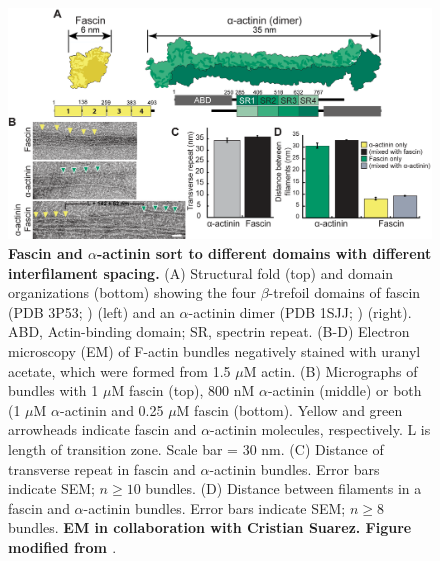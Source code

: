 \begin{figure}
\centering
\includegraphics[width=14cm]{img/ch03/Thesis_EM_fig.png}
\caption[Fascin and \texorpdfstring{$\alpha$}{alpha}-actinin sort to different domains with different interfilament spacing.]{\textbf{Fascin and $\alpha$-actinin sort to different domains with different interfilament spacing.} (A) Structural fold (top) and domain organizations (bottom) showing the four $\beta$-trefoil domains of fascin (PDB 3P53; \citep{jansen_mechanism_2011}) (left) and an $\alpha$-actinin dimer (PDB 1SJJ; \citep{liu_3-d_2004}) (right). ABD, Actin-binding domain; SR, spectrin repeat. (B-D) Electron microscopy (EM) of F-actin bundles negatively stained with uranyl acetate, which were formed from 1.5 $\mu$M actin. (B) Micrographs of bundles with 1 $\mu$M fascin (top), 800 nM $\alpha$-actinin (middle) or both (1 $\mu$M $\alpha$-actinin and 0.25 $\mu$M fascin (bottom). Yellow and green arrowheads indicate fascin and $\alpha$-actinin molecules, respectively. L is length of transition zone. Scale bar = 30 nm. (C) Distance of transverse repeat in fascin and $\alpha$-actinin bundles. Error bars indicate SEM; $n\geq 10$ bundles. (D) Distance between filaments in a fascin and $\alpha$-actinin bundles. Error bars indicate SEM; $n\geq 8$ bundles. \textbf{EM in collaboration with Cristian Suarez. Figure modified from \citep{winkelman_fascin-_2016}}.}
\label{fig:em_fascin_aact}
\end{figure}

